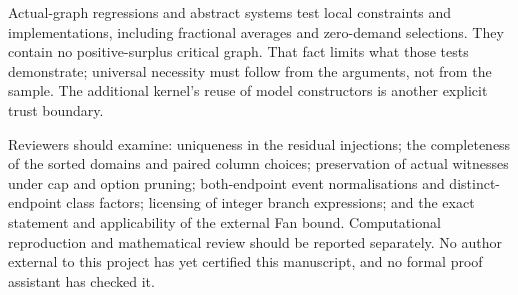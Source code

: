 \documentclass[11pt,a4paper]{article}
\begin{document}
Actual-graph regressions and abstract systems test local constraints and implementations, including fractional averages and zero-demand selections. They contain no positive-surplus critical graph. That fact limits what those tests demonstrate; universal necessity must follow from the arguments, not from the sample. The additional kernel's reuse of model constructors is another explicit trust boundary.

Reviewers should examine: uniqueness in the residual injections; the completeness of the sorted domains and paired column choices; preservation of actual witnesses under cap and option pruning; both-endpoint event normalisations and distinct-endpoint class factors; licensing of integer branch expressions; and the exact statement and applicability of the external Fan bound. Computational reproduction and mathematical review should be reported separately. No author external to this project has yet certified this manuscript, and no formal proof assistant has checked it.
\end{document}
